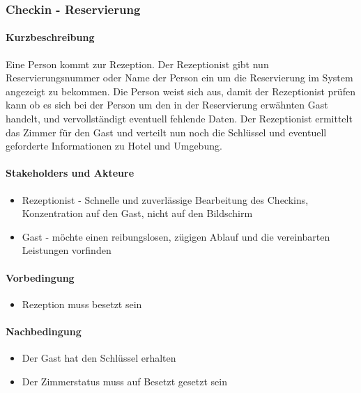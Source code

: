\subsubsection{Checkin - Reservierung}

\paragraph{Kurzbeschreibung}
Eine Person kommt zur Rezeption. Der \Gls{Rezeptionist} gibt nun \Gls{Reservierungsnummer} oder Name der Person ein um die \Gls{Reservierung} im System angezeigt zu bekommen. Die Person weist sich aus, damit der \Gls{Rezeptionist} prüfen kann ob es sich bei der Person um den in der Reservierung erwähnten \Gls{Gast} handelt, und vervollständigt eventuell fehlende Daten. Der \Gls{Rezeptionist} ermittelt das \Gls{Zimmer} für den \Gls{Gast} und verteilt nun noch die Schlüssel und eventuell geforderte Informationen zu Hotel und Umgebung.

\paragraph{Stakeholders und Akteure}
\begin{itemize}
	\item \Gls{Rezeptionist} - Schnelle und zuverlässige Bearbeitung des \Gls{Checkin}s, Konzentration auf den \Gls{Gast}, nicht auf den Bildschirm
	\item \Gls{Gast} - möchte einen reibungslosen, zügigen Ablauf und die vereinbarten Leistungen vorfinden
\end{itemize}

\paragraph{Vorbedingung}
\begin{itemize}
	\item Rezeption muss besetzt sein
\end{itemize}

\paragraph{Nachbedingung}
\begin{itemize}
	\item Der Gast hat den Schlüssel erhalten
	\item Der Zimmerstatus muss auf Besetzt gesetzt sein
\end{itemize}
